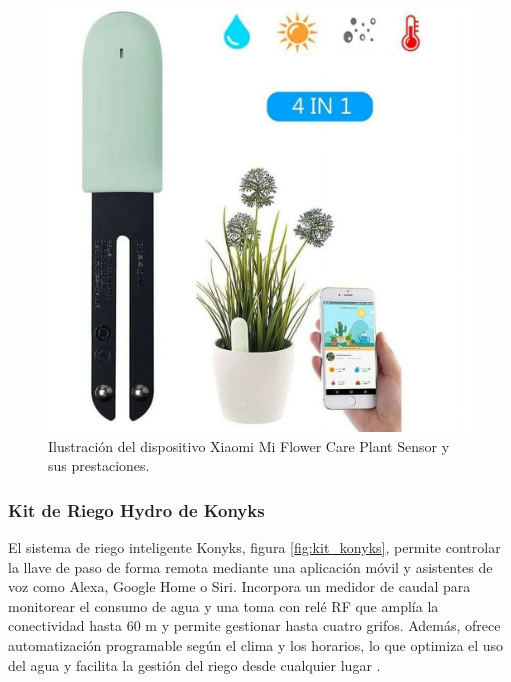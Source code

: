 \begin{figure}[H]
	\centering
	\includegraphics[scale=.14]{./Figures/xiaomi.jpg}
	\caption{Ilustración del dispositivo Xiaomi Mi Flower Care Plant Sensor y sus prestaciones\protect\footnotemark.}
	\label{fig:xiaomi}
\end{figure}






\subsubsection{Kit de Riego Hydro de Konyks}
El sistema de riego inteligente Konyks, figura \ref{fig:kit_konyks}, permite controlar la llave de paso de forma remota mediante una aplicación móvil y asistentes de voz como Alexa, Google Home o Siri. Incorpora un medidor de caudal para monitorear el consumo de agua y una toma con relé RF que amplía la conectividad hasta 60 m y permite gestionar hasta cuatro grifos. Además, ofrece automatización programable según el clima y los horarios, lo que optimiza el uso del agua y facilita la gestión del riego desde cualquier lugar \cite{KONIX}.

